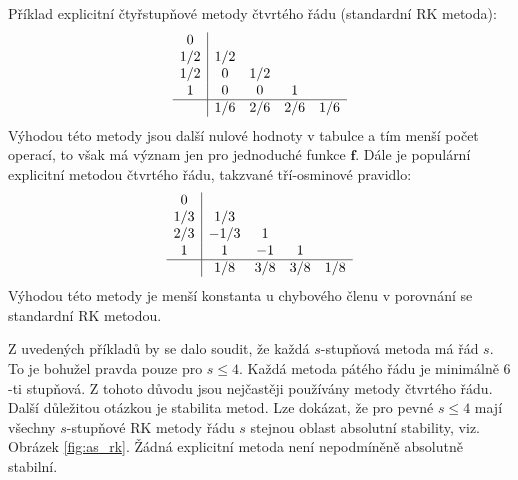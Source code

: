 \documentclass[a4paper, 12pt]{book}
\theoremstyle{definition}
\def\vc#1{\mathbf{\boldsymbol{#1}}}     %
\begin{document}
Příklad explicitní čtyřstupňové metody čtvrtého řádu (standardní RK metoda):
\begin{equation}
    \begin{array}{c|cccc}
        0 &  &  &  & \\
        1/2 & 1/2 &  &  & \\
        1/2 & 0 & 1/2 &  & \\
        1 & 0 & 0 & 1 & \\
        \hline
             & 1/6 & 2/6 & 2/6 & 1/6 \\
    \end{array}    
\end{equation}
Výhodou této metody jsou další nulové hodnoty v tabulce a tím menší počet operací, to však má význam jen pro jednoduché funkce $\vc f$.
Dále je populární explicitní metodou čtvrtého řádu, takzvané tří-osminové pravidlo:
\begin{equation}
    \begin{array}{c|cccc}
        0 &  &  &  & \\
        1/3 & 1/3 &  &  & \\
        2/3 & -1/3 & 1 &  & \\
        1 & 1 & -1 & 1 & \\
        \hline
             & 1/8 & 3/8 & 3/8 & 1/8 \\
    \end{array}    
\end{equation}
Výhodou této metody je menší konstanta u chybového členu v porovnání se standardní RK metodou.

Z uvedených příkladů by se dalo soudit, že každá $s$-stupňová metoda má řád $s$. To je bohužel pravda pouze pro $s\le 4$.
Každá metoda pátého řádu je minimálně $6$-ti stupňová. Z tohoto důvodu jsou nejčastěji používány metody čtvrtého řádu.
Další důležitou otázkou je stabilita metod. Lze dokázat, že pro pevné $s\le  4$ mají všechny $s$-stupňové RK metody řádu $s$
stejnou oblast absolutní stability, viz. Obrázek \ref{fig:as_rk}. Žádná explicitní metoda není nepodmíněně absolutně stabilní.
\end{document}
